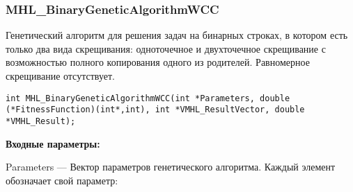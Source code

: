 \documentclass[a4paper,12pt]{article}
\begin{document}
\subsubsection{MHL\_BinaryGeneticAlgorithmWCC}\label{MHL_BinaryGeneticAlgorithmWCC}

Генетический алгоритм для решения задач на бинарных строках, в котором есть только два вида скрещивания: одноточечное и двухточечное скрещивание с возможностью полного копирования одного из родителей. Равномерное скрещивание отсутствует.


\begin{lstlisting}[label=code_syntax_MHL_BinaryGeneticAlgorithmWCC,caption=Синтаксис]
int MHL_BinaryGeneticAlgorithmWCC(int *Parameters, double (*FitnessFunction)(int*,int), int *VMHL_ResultVector, double *VMHL_Result);
\end{lstlisting}

\textbf{Входные параметры:}
 
Parameters --- Вектор параметров генетического алгоритма. Каждый элемент обозначает свой параметр:
 
\end{document}

